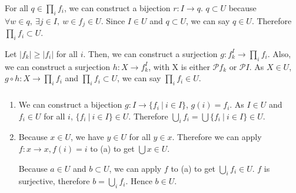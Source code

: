 \documentclass[luatex]{article}
\begin{document}
\subsubsection{}

\showArt

For all $q \in \prod_i f_i$, we can construct a bijection $r : I \rightarrow q$. $q \subset U$ because $\forall w \in q,\ \exists j \in I,\ w \in f_j \in U$. Since $I \in U$ and $q \subset U$, we can say $q \in U$. Therefore $\prod_i f_i \subset U$.

Let $|f_k| \geq |f_i|$ for all $i$. Then, we can construct a surjection $g : f_k^I \rightarrow \prod_i f_i$. Also, we can construct a surjection $h : X \rightarrow f_k^I$, with X is either $\mathcal{P} f_k$ or $\mathcal{P} I$. As $X \in U$, $g \circ h : X \rightarrow \prod_i f_i$ and $\prod_i f_i \subset U$, we can say $\prod_i f_i \in U$.

\subsubsection{}



\showArt

\begin{enumerate}[label=(\alph*)]
\item We can construct a bijection $g :  I \rightarrow \{f_i\ |\ i \in I\}$, $g(i) = f_i$. As $I \in U$ and $f_i \in U$ for all $i$, $\{f_i\ |\ i \in I\} \in U$. Therefore $ \bigcup_i f_i = \bigcup \{f_i\ |\ i \in I\} \in U$.
\item Because $x \in U$, we have $y \in U$ for all $y \in x$. Therefore we can apply $f : x \rightarrow x, f(i) = i$ to (a) to get $\bigcup x \in U$.

Because $a \in U$ and $b \subset U$, we can apply $f$ to (a) to get $\bigcup_i f_i \in U$. $f$ is surjective, therefore $b = \bigcup_i f_i$. Hence $b \in U$.
\end{enumerate}

\subsection{}

\subsection{}

\section{}
\end{document}
